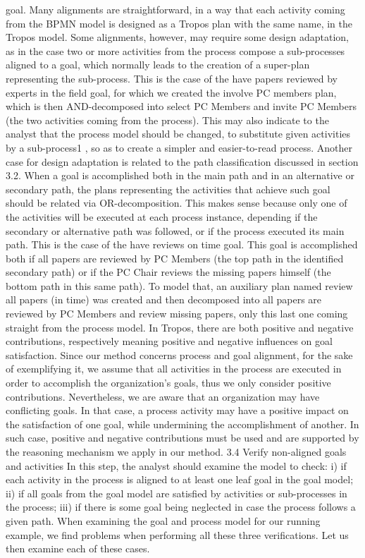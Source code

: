 goal. Many alignments are straightforward, in a way that each activity coming from the
BPMN model is designed as a Tropos plan with the same name, in the Tropos model.
Some alignments, however, may require some design adaptation, as in the case two or
more activities from the process compose a sub-processes aligned to a goal, which normally leads to the creation of a super-plan representing the sub-process. This is the case
of the have papers reviewed by experts in the field goal, for which we created the
involve PC members plan, which is then AND-decomposed into select PC Members and invite PC Members (the two activities coming from the process). This may
also indicate to the analyst that the process model should be changed, to substitute given
activities by a sub-process1
, so as to create a simpler and easier-to-read process. Another case for design adaptation is related to the path classification discussed in section
3.2. When a goal is accomplished both in the main path and in an alternative or secondary path, the plans representing the activities that achieve such goal should be related
via OR-decomposition. This makes sense because only one of the activities will be
executed at each process instance, depending if the secondary or alternative path was
followed, or if the process executed its main path. This is the case of the have reviews
on time goal. This goal is accomplished both if all papers are reviewed by PC Members
(the top path in the identified secondary path) or if the PC Chair reviews the missing
papers himself (the bottom path in this same path). To model that, an auxiliary plan
named review all papers (in time) was created and then decomposed into all papers
are reviewed by PC Members and review missing papers, only this last one coming straight from the process model.
In Tropos, there are both positive and negative contributions, respectively meaning
positive and negative influences on goal satisfaction. Since our method concerns process and goal alignment, for the sake of exemplifying it, we assume that all activities
in the process are executed in order to accomplish the organization’s goals, thus we
only consider positive contributions. Nevertheless, we are aware that an organization
may have conflicting goals. In that case, a process activity may have a positive impact
on the satisfaction of one goal, while undermining the accomplishment of another. In
such case, positive and negative contributions must be used and are supported by the
reasoning mechanism we apply in our method.
3.4 Verify non-aligned goals and activities
In this step, the analyst should examine the model to check: i) if each activity in the
process is aligned to at least one leaf goal in the goal model; ii) if all goals from the
goal model are satisfied by activities or sub-processes in the process; iii) if there is some
goal being neglected in case the process follows a given path. When examining the goal
and process model for our running example, we find problems when performing all
these three verifications. Let us then examine each of these cases.

